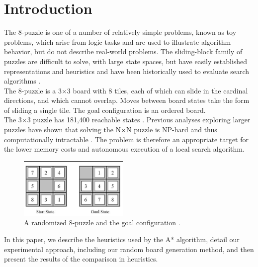 
\section{Introduction}
\label{sec:intro}

The 8-puzzle is one of a number of relatively simple problems, known as toy problems, which arise from logic tasks and are used to illustrate algorithm behavior, but do not describe real-world problems. The sliding-block family of puzzles are difficult to solve, with large state spaces, but have easily established representations and heuristics and have been historically used to evaluate search algorithms \cite{intractable}. \\

The 8-puzzle is a 3$\times$3 board with 8 tiles, each of which can slide in the cardinal directions, and which cannot overlap.  Moves between board states take the form of sliding a single tile.  The goal configuration is an ordered board. \\

The 3$\times$3 puzzle has 181,400 reachable states \cite{aima}.  Previous analyses exploring larger puzzles have shown that solving the N$\times$N puzzle is NP-hard and thus computationally intractable \cite{intractable}.  The problem is therefore an appropriate target for the lower memory costs and autonomous execution of a local search algorithm. \\

\begin{figure}[ht]
	\centering
	\includegraphics[width=0.47\textwidth]{figs/8-Puzzle.jpg}
	\caption{A randomized 8-puzzle and the goal configuration \cite{fig:puzzle}.}
	\label{fig:puzzle}
\end{figure}

In this paper, we describe the heuristics used by the A* algorithm, detail our experimental approach, including our random board generation method, and then present the results of the comparison in heuristics.

